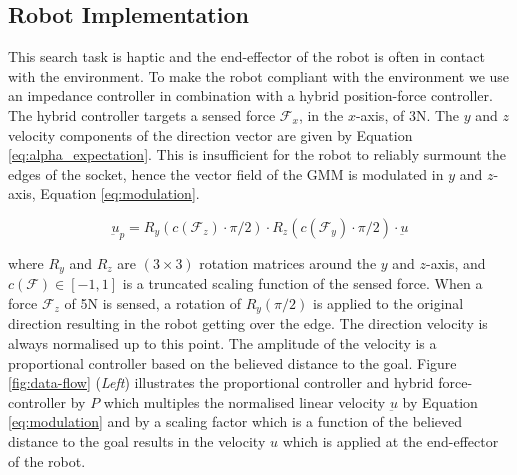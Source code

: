\documentclass[final,5p,times,twocolumn]{elsarticle}
\begin{document}
\subsection{Robot Implementation}


This search task is haptic and the end-effector of the robot is often in contact with the environment. To make the robot
compliant with the environment we use an impedance controller in combination with a hybrid position-force controller. The hybrid controller
targets a sensed force $\mathcal{F}_x$, in the $x$-axis, of 3N. The $y$ and $z$ velocity components of the direction vector are given by 
Equation \ref{eq:alpha_expectation}. This is insufficient for the robot to reliably surmount the edges of the socket,
hence the vector field of the GMM is modulated in $y$ and $z$-axis, Equation \ref{eq:modulation}.

\begin{equation}
  \underbar{u}_p = R_y(c(\mathcal{F}_z) \cdot \pi/2) \cdot R_z(c(\mathcal{F}_y) \cdot \pi/2) \cdot \underbar{u} \label{eq:modulation}
\end{equation}

where $R_y$ and $R_z$ are $(3 \times 3)$ rotation matrices around the $y$ and $z$-axis, and $c(\mathcal{F}) \in [-1,1]$ is a truncated scaling function of the sensed 
force.  When a force $\mathcal{F}_z$ of 5N is sensed, a rotation of $R_y(\pi/2)$ is applied to the original direction resulting in the robot
getting over the edge. The direction velocity is always normalised up to this point. The amplitude of the velocity is a proportional
controller based on the believed distance to the goal. Figure \ref{fig:data-flow} (\textit{Left}) illustrates the proportional controller and hybrid force-controller 
by $P$ which multiples the normalised linear velocity $\underbar{u}$ by Equation \ref{eq:modulation} and by a scaling factor which is a function of the believed distance to the goal
results in the velocity $u$ which is applied at the end-effector of the robot.


\end{document}
